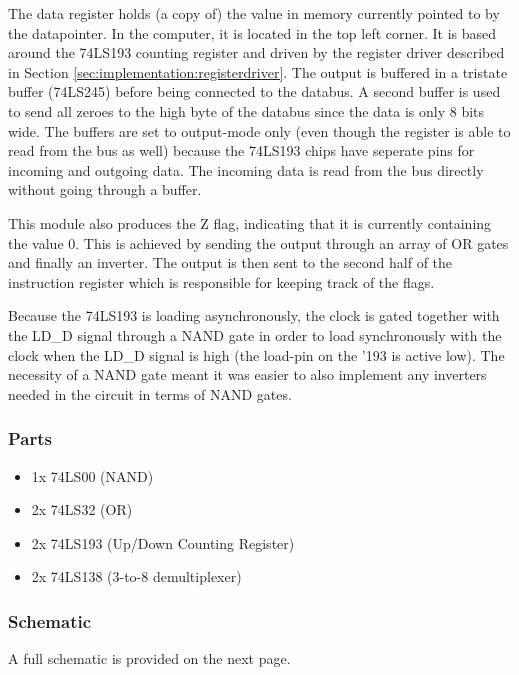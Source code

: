 The data register holds (a copy of) the value in memory currently pointed to by the datapointer. In the computer, it is located in the top left corner. It is based around the 74LS193 counting register and driven by the register driver described in Section \ref{sec:implementation:registerdriver}. The output is buffered in a tristate buffer (74LS245) before being connected to the databus. A second buffer is used to send all zeroes to the high byte of the databus since the data is only 8 bits wide. The buffers are set to output-mode only (even though the register is able to read from the bus as well) because the 74LS193 chips have seperate pins for incoming and outgoing data. The incoming data is read from the bus directly without going through a buffer.

This module also produces the Z flag, indicating that it is currently containing the value 0. This is achieved by sending the output through an array of OR gates and finally an inverter. The output is then sent to the second half of the instruction register which is responsible for keeping track of the flags.

Because the 74LS193 is loading asynchronously, the clock is gated together with the LD\_D signal through a NAND gate in order to load synchronously with the clock when the LD\_D signal is high (the load-pin on the '193 is active low). The necessity of a NAND gate meant it was easier to also implement any inverters needed in the circuit in terms of NAND gates.

\subsubsection*{Parts}
\begin{itemize}\itemsep0em
\item 1x 74LS00 (NAND)
\item 2x 74LS32 (OR)
\item 2x 74LS193 (Up/Down Counting Register)
\item 2x 74LS138 (3-to-8 demultiplexer)
\end{itemize}

\subsubsection*{Schematic}
A full schematic is provided on the next page.










